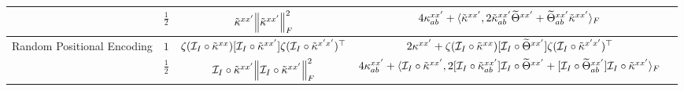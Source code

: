 \documentclass{article}
\begin{document}
\begin{table}[t]
\begin{center}
\begin{sc}
\begin{tabular}{lcccc}
    &
    $\frac{1}{2}$
    &
    $
    \tilde{\kappa}^{xx'}
    \norm{
        \tilde{\kappa}^{xx'}
    }_F^2
    $
    & 
    $
    4 
    \kappa_{ab}^{xx'}
    +
    \langle
        \tilde{\kappa}^{xx'}
        ,
        2 
        \tilde{\kappa}_{ab}^{xx'}
        \widetilde{\Theta}^{xx'}
        +
        \widetilde{\Theta}_{ab}^{xx'}
        \tilde{\kappa}^{xx'}
    \rangle_F
    $
    \\
    
    \midrule
    
    \multirow{2}{*}{
    \begin{minipage}[t]{0.2\columnwidth}%
    Random Positional Encoding
    \end{minipage}
    } 
    &
    $1$
    &
    $
    \zeta (
        \mathcal{I}_I \circ
        \tilde{\kappa}^{xx}
    )
    [
        \mathcal{I}_I \circ
        \tilde{\kappa}^{xx'}
    ]
    \zeta (
        \mathcal{I}_I \circ
        \tilde{\kappa}^{x'x'}
    )^\top
    $
    &
    $
    2
    \kappa^{xx'}
    +
    \zeta (
        \mathcal{I}_I \circ
        \tilde{\kappa}^{xx}
    )
    [
        \mathcal{I}_I \circ
        \widetilde{\Theta}^{xx'}
    ]
    \zeta (
        \mathcal{I}_I \circ
        \tilde{\kappa}^{x'x'}
    )^\top
    $
    \\ 
    
    &
    $\frac{1}{2}$
    &
    $
    \mathcal{I}_I \circ
    \tilde{\kappa}^{xx'}
    \norm{
        \mathcal{I}_I \circ \tilde{\kappa}^{xx'}
    }_F^2
    $
    & 
    $
    4 
    \kappa_{ab}^{xx'}
    +
    \langle
        \mathcal{I}_I \circ
        \tilde{\kappa}^{xx'}
        ,
        2
        [
            \mathcal{I}_I \circ
            \tilde{\kappa}_{ab}^{xx'}
        ]
            \mathcal{I}_I \circ
            \widetilde{\Theta}^{xx'}
        +
        [
            \mathcal{I}_I \circ
            \widetilde{\Theta}_{ab}^{xx'}
        ]
        \mathcal{I}_I \circ
        \tilde{\kappa}^{xx'}
    \rangle_F
    $
    \\
    

\end{tabular}
\end{sc}
\end{center}
\end{table}
\end{document}

